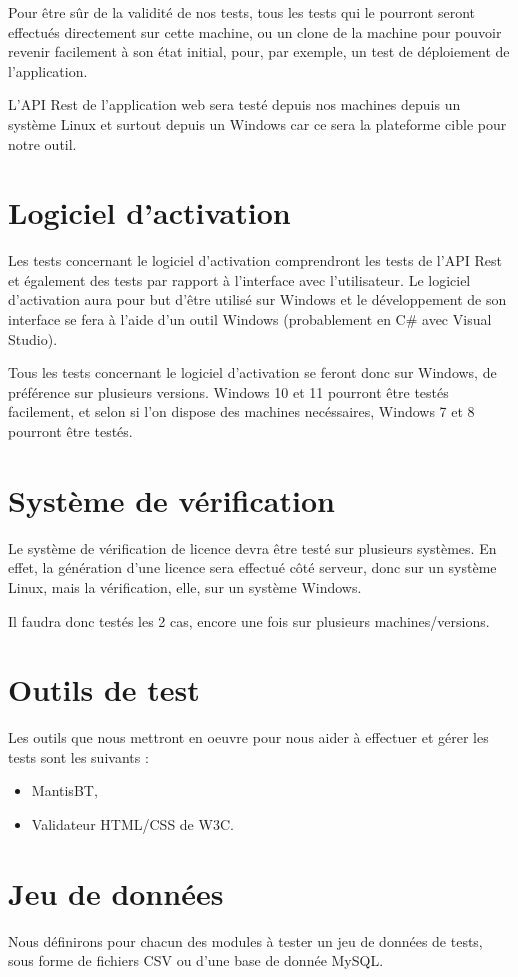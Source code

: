 Pour être sûr de la validité de nos tests, tous les tests qui le pourront seront effectués
directement sur cette machine, ou un clone de la machine pour pouvoir revenir facilement à son
état initial, pour, par exemple, un test de déploiement de l'application.

L'API Rest de l'application web sera testé depuis nos machines depuis un système Linux et surtout
depuis un Windows car ce sera la plateforme cible pour notre outil.

\section{Logiciel d'activation}
Les tests concernant le logiciel d'activation comprendront les tests de l'API Rest et également
des tests par rapport à l'interface avec l'utilisateur. Le logiciel d'activation aura pour but
d'être utilisé sur Windows et le développement de son interface se fera à l'aide d'un outil Windows
(probablement en C\# avec Visual Studio).

Tous les tests concernant le logiciel d'activation se
feront donc sur Windows, de préférence sur plusieurs versions. Windows 10 et 11 pourront être
testés facilement, et selon si l'on dispose des machines necéssaires, Windows 7 et 8 pourront être
testés.

\section{Système de vérification}
Le système de vérification de licence devra être testé sur plusieurs systèmes. En effet, la
génération d'une licence sera effectué côté serveur, donc sur un système Linux, mais la
vérification, elle, sur un système Windows.

Il faudra donc testés les 2 cas, encore une fois sur plusieurs machines/versions.

\section{Outils de test}
Les outils que nous mettront en oeuvre pour nous aider à effectuer et gérer les tests sont les
suivants :
\begin{itemize}
    \item MantisBT,
    \item Validateur HTML/CSS de W3C.
\end{itemize}

\section{Jeu de données}
Nous définirons pour chacun des modules à tester un jeu de données de tests, sous forme de fichiers
CSV ou d'une base de donnée MySQL.
 
